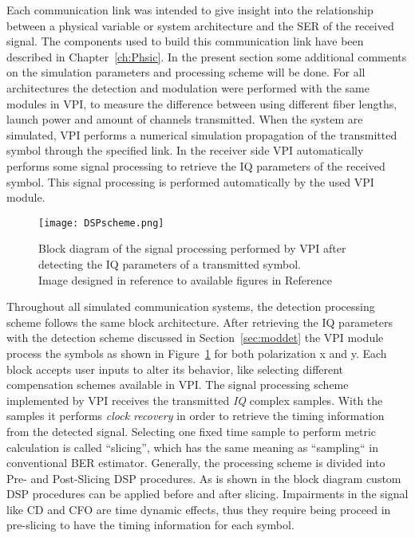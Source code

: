 Each communication link was intended to give insight into the relationship between a physical variable or system architecture and the SER of the received signal. The components used to build this communication link have been described in Chapter~\ref{ch:Phsic}. In the present section some additional comments on the simulation parameters and processing scheme will be done. For all architectures the detection and modulation were performed with the same modules in VPI, to measure the difference between using different fiber lengths, launch power and amount of channels transmitted. When the system are simulated, VPI performs a numerical simulation propagation of the transmitted symbol through the specified link. In the receiver side VPI automatically performs some signal processing to retrieve the IQ parameters of the received symbol. This signal processing is performed automatically by the used VPI module.      
 	



\begin{figure}[h!]
\centering
\texttt{[image: DSPscheme.png]}
\caption{Block diagram of the signal processing performed by VPI after detecting the IQ parameters of a transmitted symbol.\\ {\scriptsize Image designed in reference to available figures in Reference~\cite{transmissionvpi} }}
\label{fig:dspvpi}
\end{figure}


Throughout all simulated communication systems, the detection processing scheme follows the same block architecture. After retrieving the IQ parameters with the detection scheme discussed in Section~\ref{sec:moddet} the VPI module process the symbols as shown in Figure~\ref{fig:dspvpi} for both polarization x and y. Each block accepts user inputs to alter its behavior, like selecting different compensation schemes available in VPI. The signal processing scheme implemented by VPI receives the transmitted \emph{IQ} complex samples. With the samples it performs \textit{clock recovery} in order to retrieve the timing information from the detected signal. Selecting one fixed time sample to perform metric calculation is called “slicing”, which has the same meaning as “sampling“ in conventional BER estimator.  Generally, the processing scheme is divided into  Pre- and Post-Slicing DSP procedures. As is shown in the block diagram custom DSP procedures can be applied before and after slicing. Impairments in the signal like CD and CFO are time dynamic effects, thus they require being proceed in pre-slicing to have the timing information for each symbol. 


